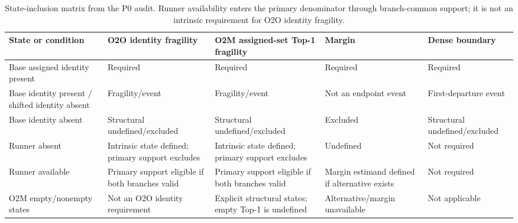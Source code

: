 \documentclass[preprint,10pt]{elsarticle}
\begin{document}
\begin{table}[p]
\centering
\caption{State-inclusion matrix from the P0 audit. Runner availability enters the primary denominator through branch-common support; it is not an intrinsic requirement for O2O identity fragility.}
\scriptsize
\begin{tabularx}{\textwidth}{@{}p{}p{}p{}p{}p{}@{}}
\toprule
State or condition & O2O identity fragility & O2M assigned-set Top-1 fragility & Margin & Dense boundary \\
\midrule
Base assigned identity present & Required & Required & Required & Required \\
Base identity present / shifted identity absent & Fragility/event & Fragility/event & Not an endpoint event & First-departure event \\
Base identity absent & Structural undefined/excluded & Structural undefined/excluded & Excluded & Structural undefined/excluded \\
Runner absent & Intrinsic state defined; primary support excludes & Intrinsic state defined; primary support excludes & Undefined & Not required \\
Runner available & Primary support eligible if both branches valid & Primary support eligible if both branches valid & Margin estimand defined if alternative exists & Not required \\
O2M empty/nonempty states & Not an O2O identity requirement & Explicit structural states; empty Top-1 is undefined & Alternative/margin unavailable & Not applicable \\
\bottomrule
\end{tabularx}
\end{table}
\end{document}
